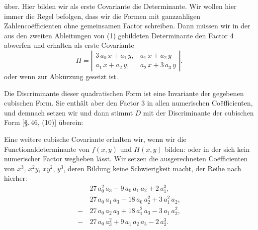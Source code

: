 über. Hier bilden wir als erste  Covariante die  Determinante. Wir wollen hier immer die Regel befolgen, dass wir die Formen mit ganzzahligen Zahlenco\"efficienten ohne gemeinsamen Factor schreiben. Dann müssen wir in der aus den zweiten Ableitungen von (1) gebildeten Determinante den Factor 4 abwerfen und erhalten als erste Covariante
\[
H = \left|\begin{array}{cc} 3\,a_0\,x + a_1\,y, & a_1\,x + a_2\,y \\ a_1\,x + a_2\,y, & a_2\,x + 3\,a_3\,y \end{array}\right|.
\]
oder
wenn zur Abkürzung
gesetzt ist.

Die Discriminante dieser quadratischen Form ist eine Invariante der gegebenen cubischen Form. Sie enthält aber den Factor 3 in allen numerischen Co\"efficienten, und demnach setzen wir
und dann stimmt $D$ mit der Discriminante der cubischen Form [\S.\,46, (10)] überein:

Eine weitere cubische Covariante erhalten wir, wenn wir die Functionaldeterminante von $f(x,y)$ und $H(x,y)$ bilden:
oder
in der sich kein numerischer Factor wegheben lässt. Wir setzen die ausgerechneten Co\"efficienten von $x^3$, $x^2y$, $xy^2$, $y^3$, deren Bildung keine Schwierigkeit macht, der Reihe nach hierher:
\[
\begin{aligned}
&27\,a_0^2\,a_3 - 9\,a_0\,a_1\,a_2 + 2\,a_1^3,\\
&27\,a_0\,a_1\,a_3 - 18\,a_0\,a_2^2 + 3\,a_1^2\,a_2,\\
-\,&27\,a_0\,a_2\,a_3 + 18\,a_1^2\,a_3 - 3\,a_1\,a_2^2,\\
-\,&27\,a_0\,a_3^2 + 9\,a_1\,a_2\,a_3 - 2\,a_2^3.
\end{aligned}
\]
